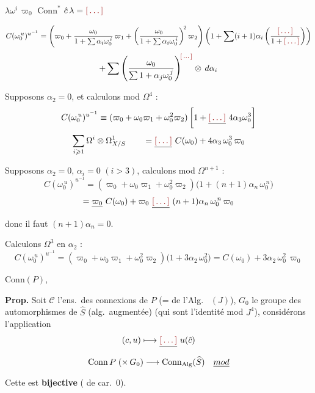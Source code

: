 \documentclass[11pt,a4paper]{article}
\begin{document}
$\lambda\omega^i\,\varpi_0$  \quad $\mathrm{Conn}^{*}$
\quad $\hat{c}\,\lambda = \ill{}$

\[
  C(\omega_0^{\,u})^{u^{-1}} =
  \left(\varpi_0 + \frac{\omega_0}{1+\sum \alpha_i \omega_0^{\,i}}\,\varpi_1
  + \left(\frac{\omega_0}{1+\sum \alpha_i \omega_0^{\,i}}\right)^{\!2}\varpi_2\right)
  \left(1 + \sum (i+1)\alpha_i \left(\frac{\ill{}}{1 + \ill{}}\right)\right)
\]
\[
  + \sum \left(\frac{\omega_0}{\sum 1 + \alpha_j \omega_0^{\,j}}\right)^{\!\ill{}} \otimes\, d\alpha_i
\]

Supposons $\alpha_2 = 0$, et calculons mod $\Omega^4$ :
\[
  C(\omega_0^{\,u})^{u^{-1}} \equiv (\varpi_0 + \omega_0\varpi_1 + \omega_0^2\varpi_2)
  \left[1 + \struck{\ill{}}\ 4\alpha_3\omega_0^3\right]
\]
\[
  \sum_{i \geqslant 1} \Omega^i \otimes \Omega^1_{X/S}
  \qquad = \struck{\ill{}}\ C(\omega_0) + 4\alpha_3\,\omega_0^3\,\varpi_0
\]

Supposons $\alpha_2 = 0$, $\alpha_i = 0$ $(i > 3)$, 
calculons mod $\Omega^{n+1}$ :
\[
  C(\omega_0^{\,u})^{u^{-1}} = (\varpi_0 + \omega_0\varpi_1 + \omega_0^2\varpi_2)
  \bigl(1 + (n+1)\alpha_n\,\omega_0^{\,n}\bigr)
\]
\[
  = \struck{\varpi_0}\ C(\omega_0) + \varpi_0\ \struck{\ill{}}\ (n+1)\alpha_n\,\omega_0^{\,n}\,\varpi_0
\]
donc il faut $(n+1)\alpha_n = 0$.

Calculons  $\Omega^3$ en  $\alpha_2$ \ill{} :
\[
  C(\omega_0^{\,u})^{u^{-1}} = (\varpi_0 + \omega_0\varpi_1 + \omega_0^2\varpi_2)
  \bigl(1 + 3\alpha_2\,\omega_0^2\bigr)
  = C(\omega_0) + 3\alpha_2\,\omega_0^2\,\varpi_0
\]

$\mathrm{Conn}(P)$,

\textbf{Prop.} Soit $\mathcal{C}$ l'ens.\ des connexions de $P$ (= de l'Alg.\
 \ill{} $(J)$), \struck{\ill{}} $G_0$ le \struck{\ill{}} groupe des
automorphismes de $\widehat{S}$ (alg.\ augmentée) (qui sont l'identité mod
$J^4$), considérons l'application
\[
  (c,u) \longmapsto \struck{\ill{}}\ u(\hat{c})
\]
\[
  \mathrm{Conn}\,P \;(\times\, G_0) \longrightarrow \mathrm{Conn}_{\mathrm{Alg}}(\widehat{S})
  \quad \struck{mod}
\]
Cette  est \textbf{bijective} (\ill{} de car.\ $0$).
\end{document}
